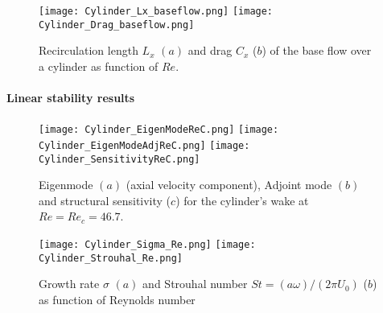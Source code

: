 \documentclass[twocolumn,10pt]{asme2ej}
\begin{document}
\begin{figure}
\texttt{[image: Cylinder\_Lx\_baseflow.png]}
\texttt{[image: Cylinder\_Drag\_baseflow.png]}
\caption{Recirculation length $L_x$ $(a)$  and drag $C_x$ ($b$) of the base flow over a cylinder as function of $Re$.}
\label{fig:LxandDrag}
\end{figure}


\paragraph{Linear stability results}



\begin{figure}
\texttt{[image: Cylinder\_EigenModeReC.png]}
\texttt{[image: Cylinder\_EigenModeAdjReC.png]}
\texttt{[image: Cylinder\_SensitivityReC.png]}
\caption{Eigenmode $(a)$  (axial velocity component),  Adjoint mode $(b)$ and structural sensitivity ($c$) for the cylinder's wake at $Re=Re_c = 46.7$.}
\label{fig:Eigenmode}
\end{figure}


\begin{figure}
\texttt{[image: Cylinder\_Sigma\_Re.png]}
\texttt{[image: Cylinder\_Strouhal\_Re.png]}
\caption{Growth rate $\sigma$ $(a)$  and Strouhal number $St = (a \omega)/(2\pi U_0)$ ($b$) as function of Reynolds number}
\label{fig:SigmaOmega}
\end{figure}

\end{document}
